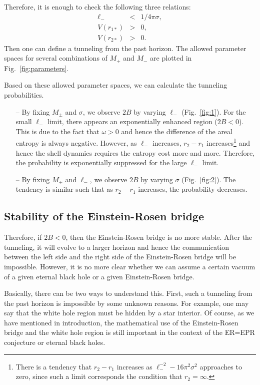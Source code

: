 \documentclass[preprintnumbers,10pt,nofootinbib]{revtex4}
\begin{document}
Therefore, it is enough to check the following three relations:
\begin{eqnarray}
\ell_{-} &<& 1/4\pi\sigma, \label{eq:cond1}\\
V(r_{1*}) &>& 0, \label{eq:cond2}\\
V(r_{2*}) &>& 0. \label{eq:cond3}
\end{eqnarray}
Then one can define a tunneling from the past horizon. The allowed parameter spaces for several combinations of $M_{+}$ and $M_{-}$ are plotted in Fig.~\ref{fig:parameters}.

Based on these allowed parameter spaces, we can calculate the tunneling probabilities.
\begin{itemize}
\item[--] By fixing $M_{\pm}$ and $\sigma$, we observe $2B$ by varying $\ell_{-}$ (Fig.~\ref{fig:1}). For the small $\ell_{-}$ limit, there appears an exponentially enhanced region ($2B < 0$). This is due to the fact that $\omega > 0$ and hence the difference of the areal entropy is always negative. However, as $\ell_{-}$ increases, $r_{2} - r_{1}$ increases\footnote{There is a tendency that $r_{2} - r_{1}$ increases as $\ell_{-}^{-2} - 16\pi^{2} \sigma^{2}$ approaches to zero, since such a limit corresponds the condition that $r_{2} = \infty$.} and hence the shell dynamics requires the entropy cost more and more. Therefore, the probability is exponentially suppressed for the large $\ell_{-}$ limit.
\item[--] By fixing $M_{\pm}$ and $\ell_{-}$, we observe $2B$ by varying $\sigma$ (Fig.~\ref{fig:2}). The tendency is similar such that as $r_{2}-r_{1}$ increases, the probability decreases.
\end{itemize}

\subsection{Stability of the Einstein-Rosen bridge}

Therefore, if $2B < 0$, then the Einstein-Rosen bridge is no more stable. After the tunneling, it will evolve to a larger horizon and hence the communication between the left side and the right side of the Einstein-Rosen bridge will be impossible. However, it is no more clear whether we can assume a certain vacuum of a given eternal black hole or a given Einstein-Rosen bridge.

Basically, there can be two ways to understand this. First, such a tunneling from the past horizon is impossible by some unknown reasons. For example, one may say that the white hole region must be hidden by a star interior. Of course, as we have mentioned in introduction, the mathematical use of the Einstein-Rosen bridge and the white hole region is still important in the context of the ER=EPR conjecture or eternal black holes.
\end{document}
